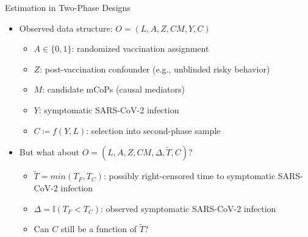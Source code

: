 \documentclass{beamer}
\begin{document}

\begin{frame}[c]{Estimation in Two-Phase Designs}

\begin{center}
\begin{itemize}
  \itemsep10pt
  \item Observed data structure: $O = (L, A, Z, CM, Y, C)$
      \begin{itemize}
          \item $A \in \{0, 1\}$: randomized vaccination assignment
          \item $Z$: post-vaccination confounder (e.g., unblinded risky behavior)
          \item $M$: candidate mCoPs (causal mediators)
          \item $Y$: symptomatic SARS-CoV-2 infection
          \item $C \coloneqq f(Y, L)$: selection into second-phase sample
      \end{itemize}
  \item But what about $O = (L, A, Z, CM, \Delta, \widetilde{T}, C)$?
      \begin{itemize}
          \item $\widetilde{T} = min(T_F, T_C)$: possibly right-censored time
              to symptomatic SARS-CoV-2 infection
          \item $\Delta = \mathbb{I}(T_F < T_C)$: observed symptomatic SARS-CoV-2
              infection
          \item Can $C$ still be a function of $\widetilde{T}$?
      \end{itemize}
\end{itemize}
\end{center}


\end{frame}

\end{document}

